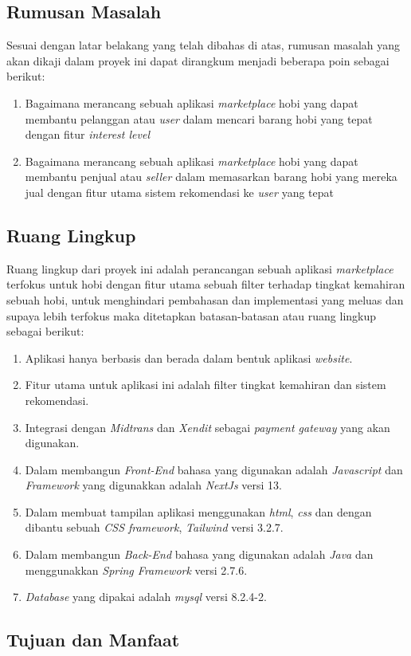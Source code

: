 \documentclass[a4paper]{article}
\newcommand{\subbab}[1]{%
    \subsection{#1}%
    \setcounter{figure}{0}
    \setcounter{table}{0}
}
\begin{document}
\subbab{Rumusan Masalah}

Sesuai dengan latar belakang yang telah dibahas di atas, rumusan masalah yang akan dikaji dalam proyek ini dapat dirangkum menjadi beberapa poin sebagai berikut:
\begin{enumerate}
    \item Bagaimana merancang sebuah aplikasi \textit{marketplace} hobi yang dapat membantu pelanggan atau \textit{user} dalam mencari barang hobi yang tepat dengan fitur \textit{interest level}
    \item Bagaimana merancang sebuah aplikasi \textit{marketplace} hobi yang dapat membantu penjual atau \textit{seller} dalam memasarkan barang hobi yang mereka jual dengan fitur utama sistem rekomendasi ke \textit{user} yang tepat
\end{enumerate}

\subbab{Ruang Lingkup}
Ruang lingkup dari proyek ini adalah perancangan sebuah aplikasi \textit{marketplace} terfokus untuk hobi dengan fitur utama sebuah filter terhadap tingkat kemahiran sebuah hobi, untuk menghindari pembahasan dan implementasi yang meluas dan supaya lebih terfokus maka ditetapkan batasan-batasan atau ruang lingkup sebagai berikut:
\begin{enumerate}
    \item Aplikasi hanya berbasis dan berada dalam bentuk aplikasi \textit{website}.
    \item Fitur utama untuk aplikasi ini adalah filter tingkat kemahiran dan  sistem rekomendasi.
    \item Integrasi dengan \textit{Midtrans} dan \textit{Xendit} sebagai \textit{payment gateway} yang akan digunakan.
    \item Dalam membangun \textit{Front-End} bahasa yang digunakan adalah \textit{Javascript} dan \textit{Framework} yang digunakkan adalah \textit{NextJs} versi 13.
    \item Dalam membuat tampilan aplikasi menggunakan \textit{html}, \textit{css} dan dengan dibantu sebuah \textit{CSS framework}, \textit{Tailwind} versi 3.2.7.
    \item Dalam membangun \textit{Back-End} bahasa yang digunakan adalah \textit{Java} dan menggunakkan \textit{Spring Framework} versi 2.7.6.
    \item \textit{Database} yang dipakai adalah \textit{mysql} versi 8.2.4-2.
\end{enumerate}

\subbab{Tujuan dan Manfaat}
\end{document}
